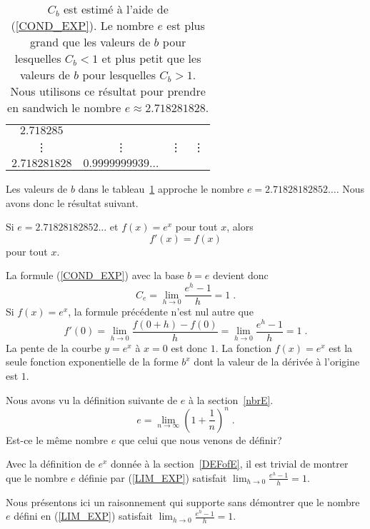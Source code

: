 {\begin{table}
{\begin{center}
\begin{tabular}{|c|c|c|l|}
$2.718285$ \\
 \vdots & \vdots & \vdots & \vdots \\
$2.718281828$ & $0.9999999939\ldots$ & & \\
\hline
\end{tabular}
\end{center}
}
\caption[Approximation de $e$]{$C_b$ est estimé à l'aide de (\ref{COND_EXP}).
Le nombre $e$ est plus grand que les valeurs de $b$ pour lesquelles
$C_b<1$ et plus petit que les valeurs de $b$ pour lesquelles $C_b>1$.  Nous
utilisons ce résultat pour prendre en sandwich le nombre
$e \approx 2.718281828$.  \label{TAB_EXP}} 
\end{table}

Les valeurs de $b$ dans le tableau~\ref{TAB_EXP} approche le nombre
$e = 2.71828182852\ldots$.  Nous avons donc le résultat suivant.

\begin{focus}{\prp}
Si $e = 2.71828182852\ldots$ et $f(x) = e^x$ pour tout $x$, alors
\[
f'(x) = f(x)
\]
pour tout $x$.
\end{focus}

La formule (\ref{COND_EXP}) avec la base $b = e$ devient donc
\[
C_e = \lim_{h\rightarrow 0} \frac{e^h-1}{h} = 1 \;.
\]
Si $f(x) = e^x$, la formule précédente n'est nul autre que
\[
f'(0) = \lim_{h\rightarrow 0} \frac{f(0+h) - f(0)}{h} =
\lim_{h\rightarrow 0} \frac{e^h-1}{h} = 1 \;.
\]
La pente de la courbe $y=e^x$ à $x=0$ est donc $1$.  La fonction
$f(x)=e^x$ est la seule fonction exponentielle de la forme $b^x$ dont
la valeur de la dérivée à l'origine est $1$.

\begin{rmk}
Nous avons vu la définition suivante de $e$ à la section~\ref{nbrE}.
\begin{equation} \label{LIM_EXP}
e = \lim_{n\rightarrow \infty} \left(1+\frac{1}{n}\right)^n \; .
\end{equation}
Est-ce le même nombre $e$ que celui que nous venons de définir?

Avec la définition de $e^x$ donnée à la section~\ref{DEFofE}, il est
trivial de montrer que le nombre $e$ définie par (\ref{LIM_EXP})
satisfait $\displaystyle \lim_{h\rightarrow 0} \frac{e^h-1}{h} = 1$.

Nous présentons ici un raisonnement qui supporte sans démontrer que le
nombre $e$ défini en (\ref{LIM_EXP}) satisfait
$\displaystyle \lim_{h\rightarrow 0} \frac{e^h-1}{h} = 1$.


\end{rmk}}
